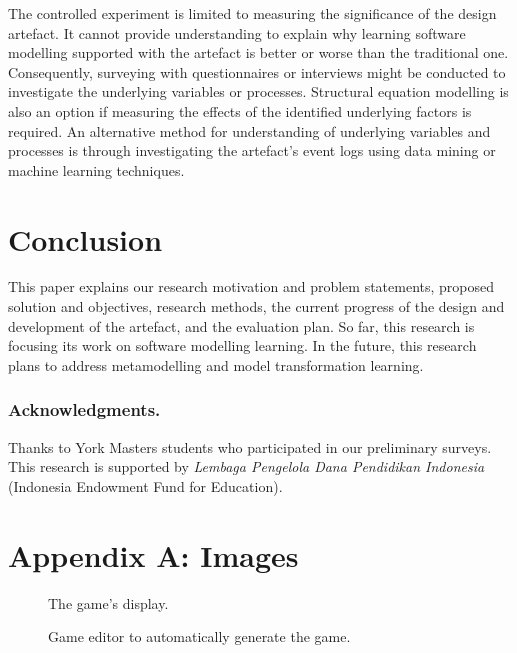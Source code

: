 \documentclass[runningheads,a4paper]{llncs}
\begin{document}
The controlled experiment is limited to measuring the significance of the design artefact. It cannot provide understanding to explain why learning software modelling supported with the artefact is better or worse than the traditional one. Consequently, surveying with questionnaires or interviews might be conducted to investigate the underlying variables or processes. Structural equation modelling \cite{hair2016primer} is also an option if measuring the effects of the identified underlying factors is required. An alternative method for understanding of underlying variables and processes is through investigating the artefact's event logs using data mining or machine learning techniques.

\section{Conclusion}
This paper explains our research motivation and problem statements, proposed solution and objectives, research methods, the current progress of the design and development of the artefact, and the evaluation plan. So far, this research is focusing its work on software modelling learning. In the future, this research plans to address metamodelling and model transformation learning. 

\subsubsection*{Acknowledgments.} Thanks to York Masters students who participated in our preliminary surveys. This research is supported by \emph{Lembaga Pengelola Dana Pendidikan Indonesia} (Indonesia Endowment Fund for Education). 

 


\clearpage
\section{Appendix A: Images}

\begin{figure}[H]
\centering
{}
\caption{The game's display.}
\end{figure}

\begin{figure}[H]
\centering
{}
\caption{Game editor to automatically generate the game.}
\end{figure}
\end{document}

